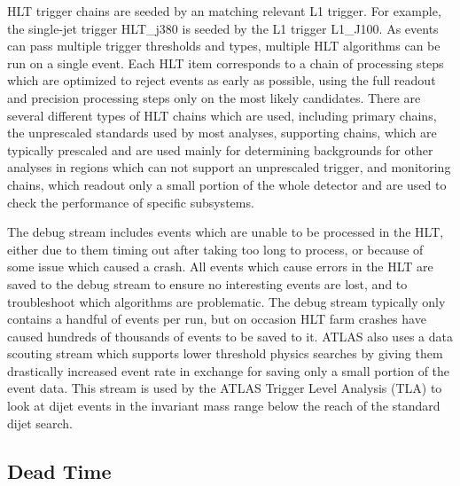 HLT trigger chains are seeded by an matching relevant L1 trigger.  For example, the single-jet trigger HLT\_j380 is seeded by the L1 trigger L1\_J100.  As events can pass multiple trigger thresholds and types, multiple HLT algorithms can be run on a single event.  Each HLT item corresponds to a chain of processing steps which are optimized to reject events as early as possible, using the full readout and precision processing steps only on the most likely candidates.  There are several different types of HLT chains which are used, including primary chains, the unprescaled standards used by most analyses, supporting chains, which are typically prescaled and are used mainly for determining backgrounds for other analyses in regions which can not support an unprescaled trigger, and monitoring chains, which readout only a small portion of the whole detector and are used to check the performance of specific subsystems.

The debug stream includes events which are unable to be processed in the HLT, either due to them timing out after taking too long to process, or because of some issue which caused a crash.  All events which cause errors in the HLT are saved to the debug stream to ensure no interesting events are lost, and to troubleshoot which algorithms are problematic.  The debug stream typically only contains a handful of events per run, but on occasion HLT farm crashes have caused hundreds of thousands of events to be saved to it.  ATLAS also uses a data scouting stream which supports lower threshold physics searches by giving them drastically increased event rate in exchange for saving only a small portion of the event data.  This stream is used by the ATLAS Trigger Level Analysis (TLA) to look at dijet events in the invariant mass range below the reach of the standard dijet search.

\subsection{Dead Time}


